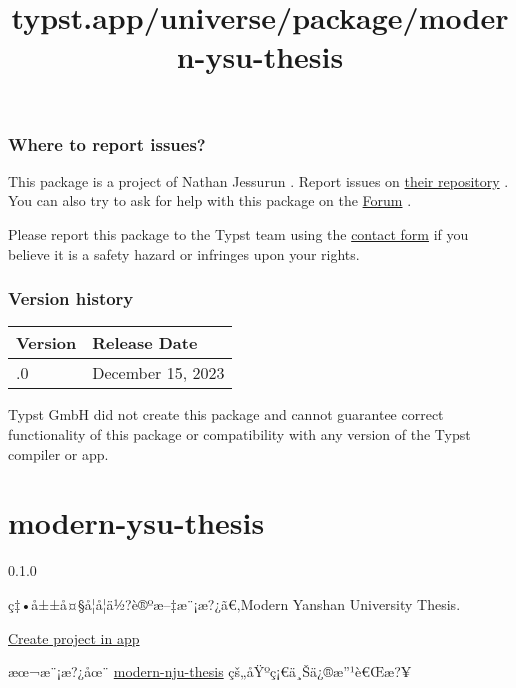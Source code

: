 \subsubsection{Where to report issues?}\label{where-to-report-issues}

This package is a project of Nathan Jessurun . Report issues on
\href{https://github.com/ntjess/typst-tada}{their repository} . You can
also try to ask for help with this package on the
\href{https://forum.typst.app}{Forum} .

Please report this package to the Typst team using the
\href{https://typst.app/contact}{contact form} if you believe it is a
safety hazard or infringes upon your rights.

\label{versions}
\subsubsection{Version history}\label{version-history}

\begin{longtable}[]{@{}ll@{}}
\toprule\noalign{}
Version & Release Date \\
\midrule\noalign{}
\endhead
\bottomrule\noalign{}
\endlastfoot
0.1.0 & December 15, 2023 \\
\end{longtable}

Typst GmbH did not create this package and cannot guarantee correct
functionality of this package or compatibility with any version of the
Typst compiler or app.


\title{typst.app/universe/package/modern-ysu-thesis}

\label{banner}
\label{template-thumbnail}

\section{modern-ysu-thesis}\label{modern-ysu-thesis}

{ 0.1.0 }

ç‡•å±±å¤§å­¦å­¦ä½?è®ºæ--‡æ¨¡æ?¿ã€‚Modern Yanshan University Thesis.

\href{/app?template=modern-ysu-thesis&version=0.1.0}{Create project in
app}

\label{readme}
æœ¬æ¨¡æ?¿åœ¨
\href{https://github.com/nju-lug/modern-nju-thesis}{modern-nju-thesis}
çš„åŸºç¡€ä¸Šä¿®æ''¹è€Œæ?¥

